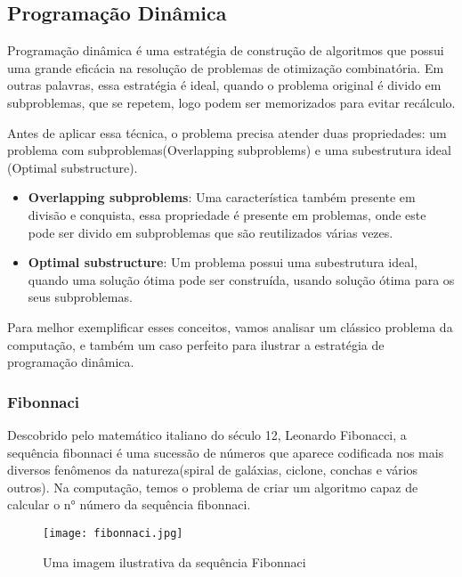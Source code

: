 
  \subsection{Programação Dinâmica}

    Programação dinâmica é uma estratégia de construção de algoritmos que 
    possui uma grande eficácia na resolução de problemas de otimização combinatória.
    Em outras palavras, essa estratégia é ideal, quando o problema original 
    é divido em subproblemas, que se repetem, logo podem ser memorizados para 
    evitar recálculo.

    Antes de aplicar essa técnica, o problema precisa atender duas propriedades:
    um problema com subproblemas(Overlapping subproblems) e uma subestrutura ideal
    (Optimal substructure).

    \begin{itemize}
      \item \textbf{Overlapping subproblems}: Uma característica também presente em divisão 
      e conquista, essa propriedade é presente em problemas, onde este pode ser 
      divido em subproblemas que são reutilizados várias vezes.
      \item \textbf{Optimal substructure}: Um problema possui uma subestrutura ideal, quando 
      uma solução ótima pode ser construída, usando solução ótima para os seus subproblemas.
    \end{itemize}

    Para melhor exemplificar esses conceitos, vamos analisar um clássico problema da computação, 
    e também um caso perfeito para ilustrar a estratégia de programação dinâmica.

    \subsubsection{Fibonnaci}

    Descobrido pelo matemático italiano do século 12, Leonardo Fibonacci, a sequência 
    fibonnaci é uma sucessão de números que aparece codificada nos mais diversos fenômenos 
    da natureza(spiral de galáxias, ciclone, conchas e vários outros). Na computação, temos 
    o problema de criar um algoritmo capaz de calcular o n° número da sequência fibonnaci.

    \begin{figure}[ht]
      \centering
      \texttt{[image: fibonnaci.jpg]}
      \caption{Uma imagem ilustrativa da sequência Fibonnaci}
      \label{fig:fibonnaci}
    \end{figure}

